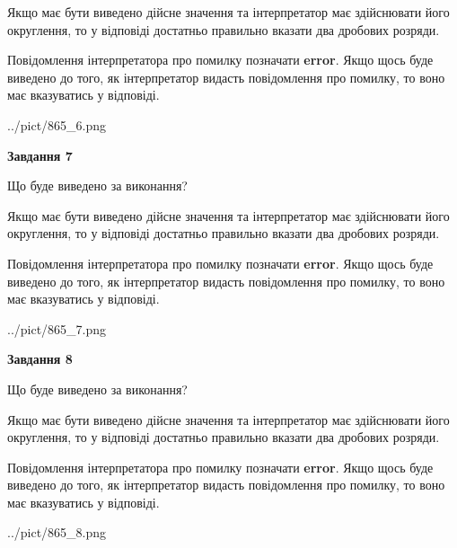 \documentclass[12pt, ukrainian]{article}
\begin{document}
{\begin {Large}
Якщо має бути виведено дійсне значення та інтерпретатор має здійснювати його округлення, 
то у відповіді достатньо правильно вказати два дробових розряди.

Повідомлення інтерпретатора про помилку позначати \textbf{error}.
Якщо щось буде виведено до того, як інтерпретатор видасть повідомлення про помилку, 
то воно має вказуватись у відповіді. \par

\begin{center}
	{../pict/865_6.png}
\end{center}
\newpage

{\begin {center}\textbf{Завдання 7}\end {center}}\par
Що буде виведено за виконання? \par

Якщо має бути виведено дійсне значення та інтерпретатор має здійснювати його округлення, 
то у відповіді достатньо правильно вказати два дробових розряди.

Повідомлення інтерпретатора про помилку позначати \textbf{error}.
Якщо щось буде виведено до того, як інтерпретатор видасть повідомлення про помилку, 
то воно має вказуватись у відповіді. \par

\begin{center}
	{../pict/865_7.png}
\end{center}
\newpage

{\begin {center}\textbf{Завдання 8}\end {center}}\par
Що буде виведено за виконання? \par

Якщо має бути виведено дійсне значення та інтерпретатор має здійснювати його округлення, 
то у відповіді достатньо правильно вказати два дробових розряди.

Повідомлення інтерпретатора про помилку позначати \textbf{error}.
Якщо щось буде виведено до того, як інтерпретатор видасть повідомлення про помилку, 
то воно має вказуватись у відповіді. \par

\begin{center}
	{../pict/865_8.png}
\end{center}
\newpage


\end{Large}}
\end{document}
